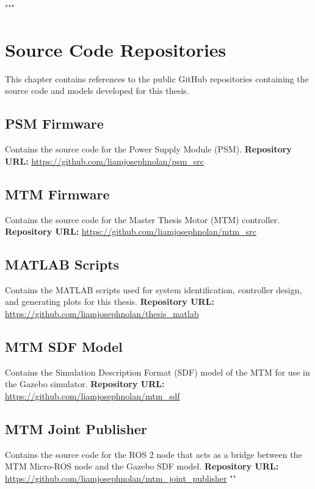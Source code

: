 """\chapter{Source Code Repositories}
\label{chap:source_code}

This chapter contains references to the public GitHub repositories containing the source code and models developed for this thesis.

\section{PSM Firmware}
\label{sec:psm_src}
Contains the source code for the Power Supply Module (PSM).
\vspace{0.5cm}
\textbf{Repository URL:} \url{https://github.com/liamjosephnolan/psm_src}

\section{MTM Firmware}
\label{sec:mtm_src}
Contains the source code for the Master Thesis Motor (MTM) controller.
\vspace{0.5cm}
\textbf{Repository URL:} \url{https://github.com/liamjosephnolan/mtm_src}

\section{MATLAB Scripts}
\label{sec:matlab_scripts}
Contains the MATLAB scripts used for system identification, controller design, and generating plots for this thesis.
\vspace{0.5cm}
\textbf{Repository URL:} \url{https://github.com/liamjosephnolan/thesis_matlab}

\section{MTM SDF Model}
\label{sec:mtm_sdf}
Contains the Simulation Description Format (SDF) model of the MTM for use in the Gazebo simulator.
\vspace{0.5cm}
\textbf{Repository URL:} \url{https://github.com/liamjosephnolan/mtm_sdf}

\section{MTM Joint Publisher}
\label{sec:mtm_joint_publisher}
Contains the source code for the ROS 2 node that acts as a bridge between the MTM Micro-ROS node and the Gazebo SDF model.
\vspace{0.5cm}
\textbf{Repository URL:} \url{https://github.com/liamjosephnolan/mtm_joint_publisher}
""